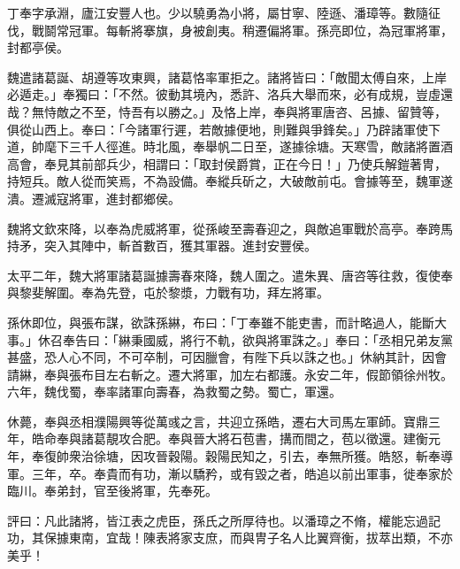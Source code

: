 
\begin{pinyinscope}
丁奉字承淵，廬江安豐人也。少以驍勇為小將，屬甘寧、陸遜、潘璋等。數隨征伐，戰鬬常冠軍。每斬將搴旗，身被創夷。稍遷偏將軍。孫亮即位，為冠軍將軍，封都亭侯。

魏遣諸葛誕、胡遵等攻東興，諸葛恪率軍拒之。諸將皆曰：「敵聞太傅自來，上岸必遁走。」奉獨曰：「不然。彼動其境內，悉許、洛兵大舉而來，必有成規，豈虛還哉？無恃敵之不至，恃吾有以勝之。」及恪上岸，奉與將軍唐咨、呂據、留贊等，俱從山西上。奉曰：「今諸軍行遲，若敵據便地，則難與爭鋒矣。」乃辟諸軍使下道，帥麾下三千人徑進。時北風，奉舉帆二日至，遂據徐塘。天寒雪，敵諸將置酒高會，奉見其前部兵少，相謂曰：「取封侯爵賞，正在今日！」乃使兵解鎧著冑，持短兵。敵人從而笑焉，不為設備。奉縱兵斫之，大破敵前屯。會據等至，魏軍遂潰。遷滅寇將軍，進封都鄉侯。

魏將文欽來降，以奉為虎威將軍，從孫峻至壽春迎之，與敵追軍戰於高亭。奉跨馬持矛，突入其陣中，斬首數百，獲其軍器。進封安豐侯。

太平二年，魏大將軍諸葛誕據壽春來降，魏人圍之。遣朱異、唐咨等往救，復使奉與黎斐解圍。奉為先登，屯於黎漿，力戰有功，拜左將軍。

孫休即位，與張布謀，欲誅孫綝，布曰：「丁奉雖不能吏書，而計略過人，能斷大事。」休召奉告曰：「綝秉國威，將行不軌，欲與將軍誅之。」奉曰：「丞相兄弟友黨甚盛，恐人心不同，不可卒制，可因臘會，有陛下兵以誅之也。」休納其計，因會請綝，奉與張布目左右斬之。遷大將軍，加左右都護。永安二年，假節領徐州牧。六年，魏伐蜀，奉率諸軍向壽春，為救蜀之勢。蜀亡，軍還。

休薨，奉與丞相濮陽興等從萬彧之言，共迎立孫皓，遷右大司馬左軍師。寶鼎三年，皓命奉與諸葛靚攻合肥。奉與晉大將石苞書，搆而間之，苞以徵還。建衡元年，奉復帥衆治徐塘，因攻晉穀陽。穀陽民知之，引去，奉無所獲。皓怒，斬奉導軍。三年，卒。奉貴而有功，漸以驕矜，或有毀之者，皓追以前出軍事，徙奉家於臨川。奉弟封，官至後將軍，先奉死。

評曰：凡此諸將，皆江表之虎臣，孫氏之所厚待也。以潘璋之不脩，權能忘過記功，其保據東南，宜哉！陳表將家支庶，而與冑子名人比翼齊衡，拔萃出類，不亦美乎！


\end{pinyinscope}